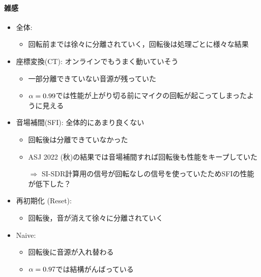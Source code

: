 \documentclass[twocolumn,9pt,dvipdfmx]{article}
\begin{document}
\paragraph{雑感}
\begin{itemize}
  \item 全体:
    \begin{itemize}
      \item 回転前までは徐々に分離されていく，回転後は処理ごとに様々な結果
    \end{itemize}
  \item 座標変換(CT): オンラインでもうまく動いていそう
    \begin{itemize}
      \item 一部分離できていない音源が残っていた
      \item $\alpha=0.99$では性能が上がり切る前にマイクの回転が起こってしまったように見える
    \end{itemize}
  \item 音場補間(SFI): 全体的にあまり良くない
    \begin{itemize}
      \item 回転後は分離できていなかった
      \item ASJ 2022 (秋)の結果では音場補間すれば回転後も性能をキープしていた
      \item[$\Rightarrow$] SI-SDR計算用の信号が回転なしの信号を使っていたためSFIの性能が低下した？
    \end{itemize}
  \item 再初期化 (Reset):
    \begin{itemize}
      \item 回転後，音が消えて徐々に分離されていく
    \end{itemize}
  \item Naive:
    \begin{itemize}
      \item 回転後に音源が入れ替わる
      \item $\alpha=0.97$では結構がんばっている
    \end{itemize}
\end{itemize}
\end{document}
